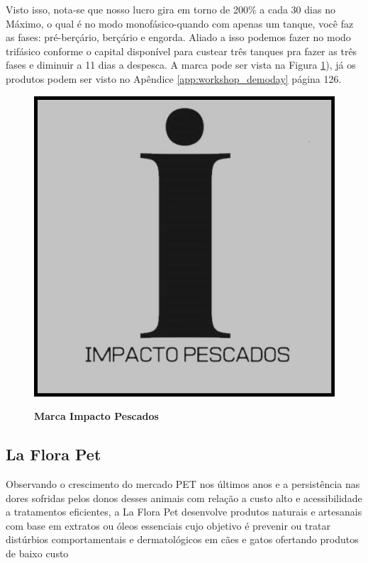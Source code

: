 Visto isso, nota-se que nosso lucro gira em torno de 200\% a cada 30 dias no Máximo, o qual é no modo monofásico-quando com apenas um tanque, você faz as fases: pré-berçário, berçário e engorda. Aliado a isso podemos fazer no modo trifásico conforme o capital disponível para custear três tanques pra fazer as três fases e diminuir a 11 dias a despesca. A marca pode ser vista na Figura \ref{figura_23}), já os produtos podem ser visto no Apêndice \ref{app:workshop_demoday} página 126.

\begin{figure}[H]
\centering
\caption{\textbf{Marca Impacto Pescados}}
\includegraphics[scale=0.3]{Imagens/imacto_pescados.jpg}
\label{figura_23}
\end{figure}


\subsection{La Flora Pet}

Observando o crescimento do mercado PET nos últimos anos e a persistência nas dores sofridas pelos donos desses animais com relação a custo alto e acessibilidade a tratamentos eficientes, a La Flora Pet desenvolve produtos naturais e artesanais com base em extratos ou óleos essenciais cujo objetivo é prevenir ou tratar distúrbios comportamentais e dermatológicos em cães e gatos ofertando produtos de baixo custo

